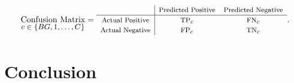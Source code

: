 \begin{equation}
\underset{\text{\fontsize{9}{11}\selectfont $c \in \{BG, 1, \dots, C\}$}}{\text{Confusion Matrix}} =
\begin{array}{c|cc}
& \text{\footnotesize Predicted Positive} & \text{\footnotesize Predicted Negative} \\
\hline
\text{\footnotesize Actual Positive} & \text{\footnotesize TP}_c & \text{\footnotesize FN}_c \\
\text{\footnotesize Actual Negative} & \text{\footnotesize FP}_c & \text{\footnotesize TN}_c \\
\end{array}.
\label{eq:confusion_matrix}
\end{equation}


\section{Conclusion}
\label{sec:2_conclusion}

